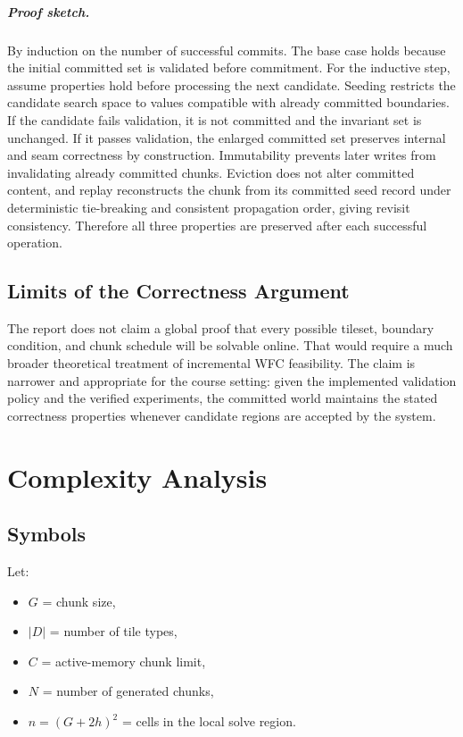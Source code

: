 \documentclass[12pt,a4paper]{report}
\begin{document}
\paragraph{Proof sketch.} By induction on the number of successful commits. The base case holds because the initial committed set is validated before commitment. For the inductive step, assume properties hold before processing the next candidate. Seeding restricts the candidate search space to values compatible with already committed boundaries. If the candidate fails validation, it is not committed and the invariant set is unchanged. If it passes validation, the enlarged committed set preserves internal and seam correctness by construction. Immutability prevents later writes from invalidating already committed chunks. Eviction does not alter committed content, and replay reconstructs the chunk from its committed seed record under deterministic tie-breaking and consistent propagation order, giving revisit consistency. Therefore all three properties are preserved after each successful operation.

\section{Limits of the Correctness Argument}
The report does not claim a global proof that every possible tileset, boundary condition, and chunk schedule will be solvable online. That would require a much broader theoretical treatment of incremental WFC feasibility. The claim is narrower and appropriate for the course setting: given the implemented validation policy and the verified experiments, the committed world maintains the stated correctness properties whenever candidate regions are accepted by the system.

\chapter{Complexity Analysis}
\section{Symbols}
Let:
\begin{itemize}
\item $G$ = chunk size,
\item $|D|$ = number of tile types,
\item $C$ = active-memory chunk limit,
\item $N$ = number of generated chunks,
\item $n = (G+2h)^2$ = cells in the local solve region.
\end{itemize}
\end{document}

